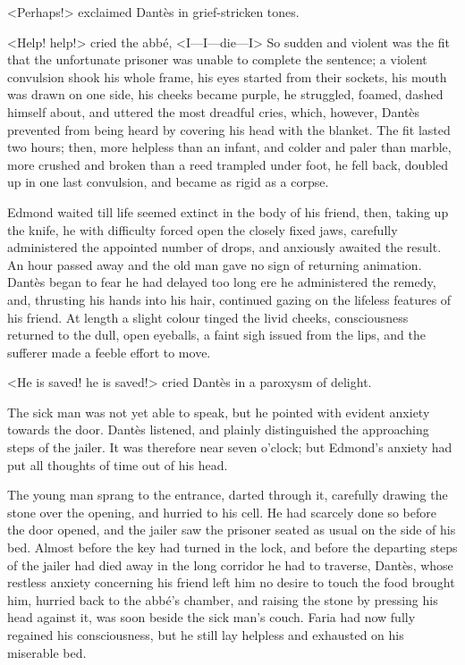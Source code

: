  <Perhaps!> exclaimed Dantès in grief-stricken tones. 

 <Help! help!> cried the abbé, <I—I—die—I\longdash>  So sudden and violent was the fit that the unfortunate prisoner was unable to complete the sentence; a violent convulsion shook his whole frame, his eyes started from their sockets, his mouth was drawn on one side, his cheeks became purple, he struggled, foamed, dashed himself about, and uttered the most dreadful cries, which, however, Dantès prevented from being heard by covering his head with the blanket. The fit lasted two hours; then, more helpless than an infant, and colder and paler than marble, more crushed and broken than a reed trampled under foot, he fell back, doubled up in one last convulsion, and became as rigid as a corpse. 

 Edmond waited till life seemed extinct in the body of his friend, then, taking up the knife, he with difficulty forced open the closely fixed jaws, carefully administered the appointed number of drops, and anxiously awaited the result. An hour passed away and the old man gave no sign of returning animation. Dantès began to fear he had delayed too long ere he administered the remedy, and, thrusting his hands into his hair, continued gazing on the lifeless features of his friend. At length a slight colour tinged the livid cheeks, consciousness returned to the dull, open eyeballs, a faint sigh issued from the lips, and the sufferer made a feeble effort to move. 

 <He is saved! he is saved!> cried Dantès in a paroxysm of delight. 

 The sick man was not yet able to speak, but he pointed with evident anxiety towards the door. Dantès listened, and plainly distinguished the approaching steps of the jailer. It was therefore near seven o'clock; but Edmond's anxiety had put all thoughts of time out of his head. 

 The young man sprang to the entrance, darted through it, carefully drawing the stone over the opening, and hurried to his cell. He had scarcely done so before the door opened, and the jailer saw the prisoner seated as usual on the side of his bed. Almost before the key had turned in the lock, and before the departing steps of the jailer had died away in the long corridor he had to traverse, Dantès, whose restless anxiety concerning his friend left him no desire to touch the food brought him, hurried back to the abbé's chamber, and raising the stone by pressing his head against it, was soon beside the sick man's couch. Faria had now fully regained his consciousness, but he still lay helpless and exhausted on his miserable bed. 


